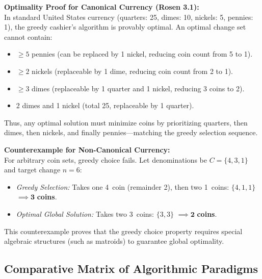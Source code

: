 \documentclass[10pt,a4paper]{article}
\theoremstyle{definition}
\begin{document}
\noindent\textbf{Optimality Proof for Canonical Currency (Rosen 3.1):}\\
In standard United States currency (quarters: 25\textcent, dimes: 10\textcent, nickels: 5\textcent, pennies: 1\textcent), the greedy cashier's algorithm is provably optimal. An optimal change set cannot contain:
\begin{itemize}[leftmargin=*,itemsep=0pt,topsep=1pt]
    \item $\ge 5$ pennies (can be replaced by 1 nickel, reducing coin count from 5 to 1).
    \item $\ge 2$ nickels (replaceable by 1 dime, reducing coin count from 2 to 1).
    \item $\ge 3$ dimes (replaceable by 1 quarter and 1 nickel, reducing 3 coins to 2).
    \item 2 dimes and 1 nickel (total 25\textcent, replaceable by 1 quarter).
\end{itemize}
Thus, any optimal solution must minimize coins by prioritizing quarters, then dimes, then nickels, and finally pennies---matching the greedy selection sequence.

\vspace{3pt}
\noindent\textbf{Counterexample for Non-Canonical Currency:}\\
For arbitrary coin sets, greedy choice fails. Let denominations be $C = \{4, 3, 1\}$ and target change $n = 6$:
\begin{itemize}[leftmargin=*,itemsep=0pt,topsep=1pt]
    \item \textit{Greedy Selection:} Takes one 4\textcent\ coin (remainder 2), then two 1\textcent\ coins: $\{4, 1, 1\}$ $\implies \mathbf{3}$ \textbf{coins}.
    \item \textit{Optimal Global Solution:} Takes two 3\textcent\ coins: $\{3, 3\}$ $\implies \mathbf{2}$ \textbf{coins}.
\end{itemize}
This counterexample proves that the greedy choice property requires special algebraic structures (such as matroids) to guarantee global optimality.

\subsection{Comparative Matrix of Algorithmic Paradigms}
\end{document}
